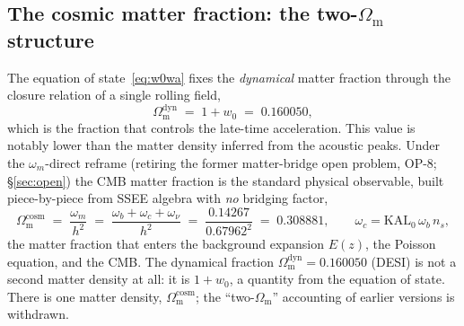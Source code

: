 \documentclass[a4paper,11pt]{article}
\newcommand{\Om}{\Omega_{\mathrm{m}}}
\begin{document}
\subsection{The cosmic matter fraction: the two-$\Om$ structure}
\label{sec:two-omega}
The equation of state~\eqref{eq:w0wa} fixes the \emph{dynamical} matter
fraction through the closure relation of a single rolling field,
\begin{equation}
  \Om^{\mathrm{dyn}} \;=\; 1+w_0 \;=\; 0.160050 ,
  \label{eq:omdyn}
\end{equation}
which is the fraction that controls the late-time acceleration. This value is
notably lower than the matter density inferred from the acoustic peaks. Under
the $\omega_m$-direct reframe (retiring the former matter-bridge open problem,
OP-8; \S\ref{sec:open}) the CMB matter fraction is the
standard physical observable, built piece-by-piece from SSEE algebra with
\emph{no} bridging factor,
\begin{equation}
  \Om^{\mathrm{cosm}} \;=\; \frac{\omega_m}{h^2}
        \;=\; \frac{\omega_b+\omega_c+\omega_\nu}{h^2}
        \;=\; \frac{0.14267}{0.67962^2} \;=\; 0.308881 ,
  \qquad \omega_c=\mathrm{KAL_0}\,\omega_b\,n_s ,
  \label{eq:omcosm}
\end{equation}
the matter fraction that enters the background expansion $E(z)$, the Poisson
equation, and the CMB. The dynamical fraction $\Om^{\mathrm{dyn}}=0.160050$ (DESI)
is not a second matter density at all: it is $1+w_0$, a quantity from the
equation of state. There is one matter density, $\Om^{\mathrm{cosm}}$; the
``two-$\Om$'' accounting of earlier versions is withdrawn.
\end{document}
